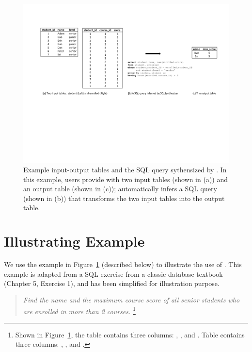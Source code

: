 
\begin{figure}[t]
  \centering
  \includegraphics[scale=0.70]{motivating}
  \vspace*{-1.0ex}\caption {{\label{fig:motivating}
  Example input-output tables and the SQL query sythensized by
  \ourtool. In this example, users provide \ourtool with
  two input tables (shown in (a)) and an output table (shown in (c));
  \ourtool automatically infers a SQL query (shown in (b)) that
  transforms the two input tables into the output table.
}}
\end{figure}

\section{Illustrating Example}
\label{sec:example}

We use the example in Figure~\ref{fig:motivating} (described below)
to illustrate the use of \ourtool. This example is
adapted from a SQL exercise from a classic
database textbook~\cite{cowbook} (Chapter 5, Exercise 1),
and has been simplified for illustration purpose.

\begin{quote}
\textit{Find the name and the maximum course score of all senior students
who are enrolled in more than 2 courses.}
\footnote{
Shown in Figure~\ref{fig:motivating}, the  table
contains three columns: , ,
and . Table  contains
three columns: , ,
and .
}
\end{quote}


